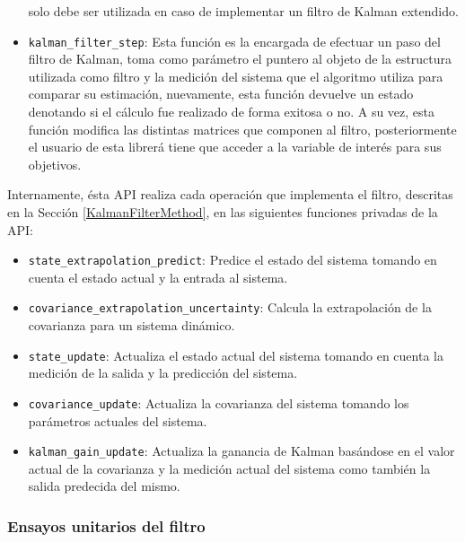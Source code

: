 \documentclass[10pt, a4paper]{report}
\begin{document}
\begin{itemize}
        solo debe ser utilizada en caso de implementar un filtro de Kalman
        extendido.
    \item \texttt{kalman\_filter\_step}: Esta funci\'on es la encargada de
        efectuar un paso del filtro de Kalman, toma como par\'ametro el puntero
        al objeto de la estructura utilizada como filtro y la medici\'on del 
        sistema que el algoritmo utiliza para comparar su estimaci\'on, 
        nuevamente, esta funci\'on devuelve un estado denotando si el c\'alculo 
        fue realizado de forma exitosa o no. A su vez, esta funci\'on modifica
        las distintas matrices que componen al filtro, posteriormente el usuario
        de esta librer\'a tiene que acceder a la variable de inter\'es para sus
        objetivos.
\end{itemize}

Internamente, \'esta \acrshort{API} realiza cada operaci\'on que implementa el 
filtro, descritas en la Secci\'on \ref{KalmanFilterMethod}, en las siguientes 
funciones privadas de la \acrshort{API}:

\begin{itemize}
    \item \texttt{state\_extrapolation\_predict}: Predice el estado del sistema
        tomando en cuenta el estado actual y la entrada al sistema.
    \item \texttt{covariance\_extrapolation\_uncertainty}: Calcula la
        extrapolaci\'on de la covarianza para un sistema din\'amico.
    \item \texttt{state\_update}: Actualiza el estado actual del sistema tomando
        en cuenta la medici\'on de la salida y la predicci\'on del sistema.
    \item \texttt{covariance\_update}: Actualiza la covarianza del sistema
        tomando los par\'ametros actuales del sistema.
    \item \texttt{kalman\_gain\_update}: Actualiza la ganancia de Kalman
        bas\'andose en el valor actual de la covarianza y la medici\'on actual
        del sistema como tambi\'en la salida predecida del mismo.
\end{itemize}

\subsubsection{Ensayos unitarios del filtro}
\end{document}
